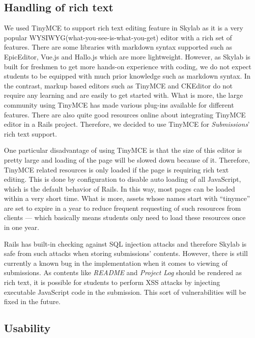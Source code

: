 \subsection{Handling of rich text}

We used TinyMCE to support rich text editing feature in Skylab as it is a very popular WYSIWYG(what-you-see-is-what-you-get) editor with a rich set of features\cite{citationtinymce}. There are some libraries with markdown syntax supported such as EpicEditor, Vue.js and Hallo.js which are more lightweight. However, as Skylab is built for freshmen to get more hands-on experience with coding, we do not expect students to be equipped with much prior knowledge such as markdown syntax. In the contrast, markup based editors such as TinyMCE and CKEditor do not require any learning and are easily to get started with. What is more, the large community using TinyMCE has made various plug-ins available for different features. There are also quite good resources online about integrating TinyMCE editor in a Rails project. Therefore, we decided to use TinyMCE for \textit{Submissions}' rich text support.

One particular disadvantage of using TinyMCE is that the size of this editor is pretty large and loading of the page will be slowed down because of it. Therefore, TinyMCE related resources is only loaded if the page is requiring rich text editing. This is done by configuration to disable auto loading of all JavaScript, which is the default behavior of Rails. In this way, most pages can be loaded within a very short time. What is more, assets whose names start with ``tinymce'' are set to expire in a year to reduce frequent requesting of such resources from clients --- which basically means students only need to load these resources once in one year.

Rails has built-in checking against SQL injection attacks and therefore Skylab is safe from such attacks when storing submissions' contents\cite{citationrorsecurity}. However, there is still currently a known bug in the implementation when it comes to viewing of submissions. As contents like \textit{README} and \textit{Project Log} should be rendered as rich text, it is possible for students to perform XSS attacks by injecting executable JavaScript code in the submission. This sort of vulnerabilities will be fixed in the future.

\subsection{Usability}

